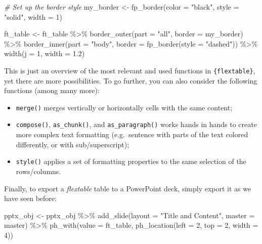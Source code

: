 \documentclass[
]{krantz}
\makeatletter
\newenvironment{Shaded}{\begin{snugshade}}{\end{snugshade}}
\newcommand{\AttributeTok}[1]{\textcolor[rgb]{0.61,0.61,0.61}{#1}}
\newcommand{\CommentTok}[1]{\textcolor[rgb]{0.37,0.37,0.37}{\textit{#1}}}
\newcommand{\DecValTok}[1]{\textcolor[rgb]{0.06,0.06,0.06}{#1}}
\newcommand{\FloatTok}[1]{\textcolor[rgb]{0.06,0.06,0.06}{#1}}
\newcommand{\FunctionTok}[1]{\textcolor[rgb]{0,0,0}{#1}}
\newcommand{\NormalTok}[1]{#1}
\newcommand{\OtherTok}[1]{\textcolor[rgb]{0.37,0.37,0.37}{#1}}
\newcommand{\SpecialCharTok}[1]{\textcolor[rgb]{0,0,0}{#1}}
\newcommand{\StringTok}[1]{\textcolor[rgb]{0.5,0.5,0.5}{#1}}
\providecommand{\tightlist}{%
  \setlength{\itemsep}{0pt}\setlength{\parskip}{0pt}}
\newenvironment{kframe}{%
\medskip{}
\setlength{\fboxsep}{.8em}
 \def\at@end@of@kframe{}%
 \ifinner\ifhmode%
  \def\at@end@of@kframe{\end{minipage}}%
  \begin{minipage}{\columnwidth}%
 \fi\fi%
 \def\FrameCommand##1{\hskip\@totalleftmargin \hskip-\fboxsep
 \colorbox{shadecolor}{##1}\hskip-\fboxsep
     \hskip-\linewidth \hskip-\@totalleftmargin \hskip\columnwidth}%
 \MakeFramed {\advance\hsize-\width
   \@totalleftmargin\z@ \linewidth\hsize
   \@setminipage}}%
 {\par\unskip\endMakeFramed%
 \at@end@of@kframe}
\renewenvironment{Shaded}{\begin{kframe}}{\end{kframe}}
\makeatother
\begin{document}
\begin{Shaded}
\begin{Highlighting}[]
\CommentTok{\# Set up the border style}
\NormalTok{my\_border }\OtherTok{\textless{}{-}} \FunctionTok{fp\_border}\NormalTok{(}\AttributeTok{color =} \StringTok{"black"}\NormalTok{, }\AttributeTok{style =} \StringTok{"solid"}\NormalTok{, }\AttributeTok{width =} \DecValTok{1}\NormalTok{)}

\NormalTok{ft\_table }\OtherTok{\textless{}{-}}\NormalTok{ ft\_table }\SpecialCharTok{\%\textgreater{}\%}
  \FunctionTok{border\_outer}\NormalTok{(}\AttributeTok{part =} \StringTok{"all"}\NormalTok{, }\AttributeTok{border =}\NormalTok{ my\_border) }\SpecialCharTok{\%\textgreater{}\%}
  \FunctionTok{border\_inner}\NormalTok{(}\AttributeTok{part =} \StringTok{"body"}\NormalTok{, }\AttributeTok{border =} \FunctionTok{fp\_border}\NormalTok{(}\AttributeTok{style =} \StringTok{"dashed"}\NormalTok{)) }\SpecialCharTok{\%\textgreater{}\%} 
  \FunctionTok{width}\NormalTok{(}\AttributeTok{j =} \DecValTok{1}\NormalTok{, }\AttributeTok{width =} \FloatTok{1.2}\NormalTok{)}
\end{Highlighting}
\end{Shaded}

This is just an overview of the most relevant and used functions in \texttt{\{flextable\}}, yet there are more possibilities.
To go further, you can also consider the following functions (among many more):

\begin{itemize}
\tightlist
\item
  \texttt{merge()} merges vertically or horizontally cells with the same content;
\item
  \texttt{compose()}, \texttt{as\_chunk()}, and \texttt{as\_paragraph()} works hands in hands to create more complex text formatting (e.g.~sentence with parts of the text colored differently, or with sub/superscript);
\item
  \texttt{style()} applies a set of formatting properties to the same selection of the rows/columns.
\end{itemize}

Finally, to export a \emph{flextable} table to a PowerPoint deck, simply export it as we have seen before:

\begin{Shaded}
\begin{Highlighting}[]
\NormalTok{pptx\_obj }\OtherTok{\textless{}{-}}\NormalTok{ pptx\_obj }\SpecialCharTok{\%\textgreater{}\%}
  \FunctionTok{add\_slide}\NormalTok{(}\AttributeTok{layout =} \StringTok{"Title and Content"}\NormalTok{, }\AttributeTok{master =}\NormalTok{ master) }\SpecialCharTok{\%\textgreater{}\%}
  \FunctionTok{ph\_with}\NormalTok{(}\AttributeTok{value =}\NormalTok{ ft\_table, }\FunctionTok{ph\_location}\NormalTok{(}\AttributeTok{left =} \DecValTok{2}\NormalTok{, }\AttributeTok{top =} \DecValTok{2}\NormalTok{, }\AttributeTok{width =} \DecValTok{4}\NormalTok{))}
\end{Highlighting}
\end{Shaded}
\end{document}
